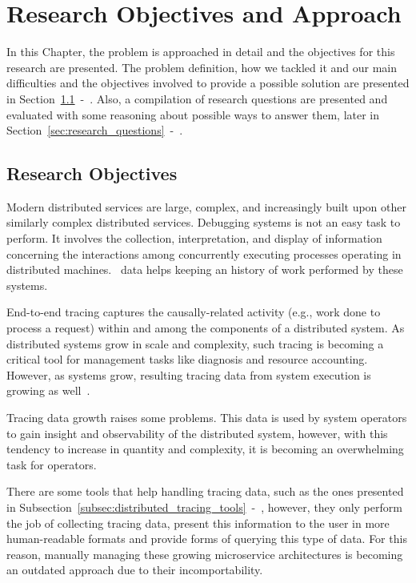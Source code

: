 \glsresetall
\chapter{Research Objectives and Approach}
\label{chap:research_objectives_and_approach}

In this Chapter, the problem is approached in detail and the objectives for this research are presented. The problem definition, how we tackled it and our main difficulties and the objectives involved to provide a possible solution are presented in Section~\ref{sec:problem_definition}~-~. Also, a compilation of research questions are presented and evaluated with some reasoning about possible ways to answer them, later in Section~\ref{sec:research_questions}~-~.

\section{Research Objectives}
\label{sec:problem_definition}

Modern distributed services are large, complex, and increasingly built upon other similarly complex distributed services. Debugging systems is not an easy task to perform. It involves the collection, interpretation, and display of information concerning the interactions among concurrently executing processes operating in distributed machines.~ data helps keeping an history of work performed by these systems.

End-to-end tracing captures the causally-related activity (e.g., work done to process a request) within and among the components of a distributed system. As distributed systems grow in scale and complexity, such tracing is becoming a critical tool for management tasks like diagnosis and resource accounting. However, as systems grow, resulting tracing data from system execution is growing as well~\cite{Sambasivan2014}.

Tracing data growth raises some problems. This data is used by system operators to gain insight and observability of the distributed system, however, with this tendency to increase in quantity and complexity, it is becoming an overwhelming task for operators.

There are some tools that help handling tracing data, such as the ones presented in Subsection~\ref{subsec:distributed_tracing_tools}~-~, however, they only perform the job of collecting tracing data, present this information to the user in more human-readable formats and provide forms of querying this type of data. For this reason, manually managing these growing microservice architectures is becoming an outdated approach due to their incomportability.


